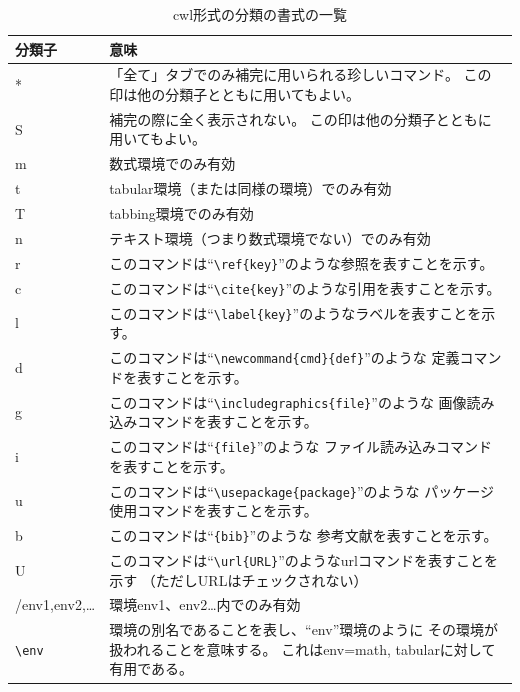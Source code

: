 \begin{table}[H]
  \centering
  \caption{cwl形式の分類の書式の一覧}
  \begin{tabularx}{\linewidth}{lX}
    \hline
    \textbf{分類子} & \textbf{意味}\\
    \hline
    * & 「全て」タブでのみ補完に用いられる珍しいコマンド。
      この印は他の分類子とともに用いてもよい。\\
    S & 補完の際に全く表示されない。 この印は他の分類子とともに用いてもよい。\\
    m & 数式環境でのみ有効\\
    t & tabular環境（または同様の環境）でのみ有効\\
    T & tabbing環境でのみ有効\\
    n & テキスト環境（つまり数式環境でない）でのみ有効\\
    r & このコマンドは``\verb+\ref+\verb+{key}+''のような参照を表すことを示す。\\
    c & このコマンドは``\verb+\cite+\verb+{key}+''のような引用を表すことを示す。\\
    l & このコマンドは``\verb+\label+\verb+{key}+''のようなラベルを表すことを示す。\\
    d & このコマンドは``\verb+\newcommand+\verb+{cmd}{def}+''のような
      定義コマンドを表すことを示す。\\
    g & このコマンドは``\verb+\includegraphics+\verb+{file}+''のような
      画像読み込みコマンドを表すことを示す。\\
    i & このコマンドは``\verb++\verb+{file}+''のような
      ファイル読み込みコマンドを表すことを示す。\\
    u & このコマンドは``\verb+\usepackage+\verb+{package}+''のような
      パッケージ使用コマンドを表すことを示す。\\
    b & このコマンドは``\verb++\verb+{bib}+''のような
      参考文献を表すことを示す。\\
    U & このコマンドは``\verb+\url+\verb+{URL}+''のようなurlコマンドを表すことを示す
      （ただしURLはチェックされない）\\
    /env1,env2,\ldots{} & 環境env1、env2\ldots{}内でのみ有効\\
    \verb+\env+ & 環境の別名であることを表し、``env''環境のように
      その環境が扱われることを意味する。
      これはenv=math, tabularに対して有用である。\\
    \hline
  \end{tabularx}
\end{table}


